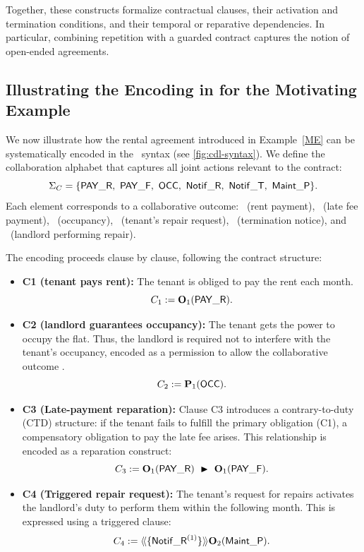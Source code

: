 Together, these constructs formalize contractual clauses, their activation and termination conditions, and their temporal or reparative dependencies. In particular, combining repetition with a guarded contract captures the notion of open-ended agreements.

  \subsection{Illustrating the Encoding in \cDL for the Motivating Example}
  \begin{example}
  \label{ex:contract-encoding}
  We now illustrate how the rental agreement introduced in Example~\ref{ME} 
  can be systematically encoded in the \cDL\ syntax (see \ref{fig:cdl-syntax}).  
  We define the collaboration alphabet that captures all joint actions relevant to the contract:
  \[
  \Sigma_C = \{\PAY,\ \PAYF,\ \OCC,\ \notifrepair,\ \notifterm,\ \REPAIR\}.
  \]
  Each element corresponds to a collaborative outcome:
  \PAY\ (rent payment), \PAYF\ (late fee payment), \OCC\ (occupancy), 
  \notifrepair\ (tenant’s repair request), \notifterm\ (termination notice), 
  and \REPAIR\ (landlord performing repair).
  
  \medskip
  The encoding proceeds clause by clause, following the contract structure:
  
  \begin{itemize}
    \item \textbf{C1 (tenant pays rent):}  
    The tenant is obliged to pay the rent each month.  
    \[
    C_1 := \obl[1]{\PAY}.
    \]
  
    \item \textbf{C2 (landlord guarantees occupancy):}  
    The tenant gets the power to occupy the flat. 
    Thus, the landlord is required not to interfere with the tenant’s occupancy, 
    encoded as a permission to allow the collaborative outcome \OCC.  
    \[
    C_2 := \perm[1]{\OCC}.
    \]
  
    \item \textbf{C3 (Late-payment reparation):}  
    Clause C3 introduces a contrary-to-duty (CTD) structure: if the tenant fails to fulfill the primary obligation (C1), a compensatory obligation to pay the late fee arises.  
    This relationship is encoded as a reparation construct:
    \[
    C_3 := \obl[1]{\PAY}\ \repair\ \obl[1]{\PAYF}.
    \]
  
    \item \textbf{C4 (Triggered repair request):}  
    The tenant’s request for repairs activates the landlord’s duty to perform them within the following month.  
    This is expressed using a triggered clause:
    \[
    C_4 := 
    \trig[\{\notifrepair^{(1)}\}]{\obl[2]{\REPAIR}}.
    \]
  

\end{itemize}
\end{example}
